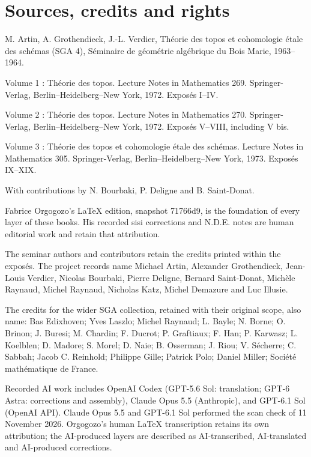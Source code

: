 \chapter*{Sources, credits and rights}
\begingroup\small
M. Artin, A. Grothendieck, J.-L. Verdier, Théorie des topos et cohomologie étale des schémas (SGA 4), Séminaire de géométrie algébrique du Bois Marie, 1963--1964.\par\medskip
Volume 1 : Théorie des topos. Lecture Notes in Mathematics 269. Springer-Verlag, Berlin--Heidelberg--New York, 1972. Exposés I--IV.\par\medskip
Volume 2 : Théorie des topos. Lecture Notes in Mathematics 270. Springer-Verlag, Berlin--Heidelberg--New York, 1972. Exposés V--VIII, including V bis.\par\medskip
Volume 3 : Théorie des topos et cohomologie étale des schémas. Lecture Notes in Mathematics 305. Springer-Verlag, Berlin--Heidelberg--New York, 1973. Exposés IX--XIX.\par\medskip
With contributions by N. Bourbaki, P. Deligne and B. Saint-Donat.\par\medskip
Fabrice Orgogozo's LaTeX edition, snapshot 71766d9, is the foundation of every layer of these books. His recorded sisi corrections and N.D.E. notes are human editorial work and retain that attribution.\par\medskip
The seminar authors and contributors retain the credits printed within the exposés. The project records name Michael Artin, Alexander Grothendieck, Jean-Louis Verdier, Nicolas Bourbaki, Pierre Deligne, Bernard Saint-Donat, Michèle Raynaud, Michel Raynaud, Nicholas Katz, Michel Demazure and Luc Illusie.\par\medskip
The credits for the wider SGA collection, retained with their original scope, also name: Bas Edixhoven; Yves Laszlo; Michel Raynaud; L. Bayle; N. Borne; O. Brinon; J. Buresi; M. Chardin; F. Ducrot; P. Graftiaux; F. Han; P. Karwasz; L. Koelblen; D. Madore; S. Morel; D. Naie; B. Osserman; J. Riou; V. Sécherre; C. Sabbah; Jacob C. Reinhold; Philippe Gille; Patrick Polo; Daniel Miller; Société mathématique de France.\par\medskip
Recorded AI work includes OpenAI Codex (GPT-5.6 Sol: translation; GPT-6 Astra: corrections and assembly), Claude Opus 5.5 (Anthropic), and GPT-6.1 Sol (OpenAI API). Claude Opus 5.5 and GPT-6.1 Sol performed the scan check of 11 November 2026. Orgogozo's human LaTeX transcription retains its own attribution; the AI-produced layers are described as AI-transcribed, AI-translated and AI-produced corrections.\par\medskip
